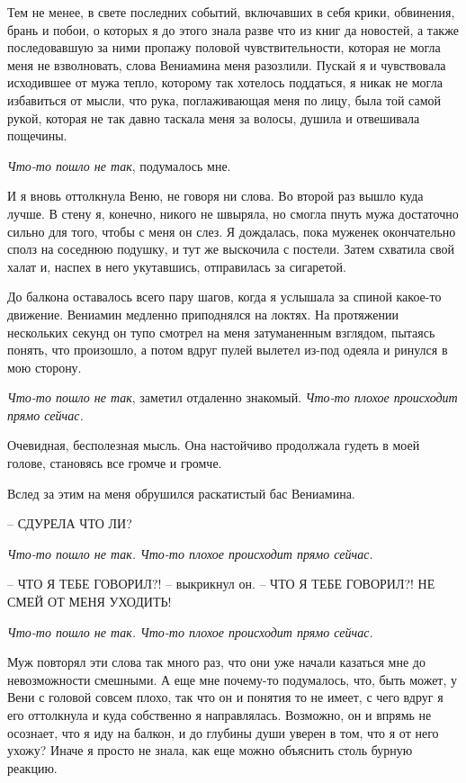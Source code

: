 \documentclass[
]{book}
\begin{document}
Тем не менее, в свете последних событий, включавших в себя крики, обвинения, брань и побои, о которых я до этого знала разве что из книг да новостей, а также последовавшую за ними пропажу половой чувствительности, которая не могла меня не взволновать, слова Вениамина меня разозлили. Пускай я и чувствовала исходившее от мужа тепло, которому так хотелось поддаться, я никак не могла избавиться от мысли, что рука, поглаживающая меня по лицу, была той самой рукой, которая не так давно таскала меня за волосы, душила и отвешивала пощечины.

\emph{Что-то пошло не так}, подумалось мне.

И я вновь оттолкнула Веню, не говоря ни слова. Во второй раз вышло куда лучше. В стену я, конечно, никого не швыряла, но смогла пнуть мужа достаточно сильно для того, чтобы с меня он слез. Я дождалась, пока муженек окончательно сполз на соседнюю подушку, и тут же выскочила с постели. Затем схватила свой халат и, наспех в него укутавшись, отправилась за сигаретой.

До балкона оставалось всего пару шагов, когда я услышала за спиной какое-то движение. Вениамин медленно приподнялся на локтях. На протяжении нескольких секунд он тупо смотрел на меня затуманенным взглядом, пытаясь понять, что произошло, а потом вдруг пулей вылетел из-под одеяла и ринулся в мою сторону.

\emph{Что-то пошло не так}, заметил отдаленно знакомый. \emph{Что-то плохое происходит прямо сейчас.}

Очевидная, бесполезная мысль. Она настойчиво продолжала гудеть в моей голове, становясь все громче и громче.

Вслед за этим на меня обрушился раскатистый бас Вениамина.

-- СДУРЕЛА ЧТО ЛИ?

\emph{Что-то пошло не так. Что-то плохое происходит прямо сейчас.}

-- ЧТО Я ТЕБЕ ГОВОРИЛ?! -- выкрикнул он. -- ЧТО Я ТЕБЕ ГОВОРИЛ?! НЕ СМЕЙ ОТ МЕНЯ УХОДИТЬ!

\emph{Что-то пошло не так. Что-то плохое происходит прямо сейчас.}

Муж повторял эти слова так много раз, что они уже начали казаться мне до невозможности смешными. А еще мне почему-то подумалось, что, быть может, у Вени с головой совсем плохо, так что он и понятия то не имеет, с чего вдруг я его оттолкнула и куда собственно я направлялась. Возможно, он и впрямь не осознает, что я иду на балкон, и до глубины души уверен в том, что я от него ухожу? Иначе я просто не знала, как еще можно объяснить столь бурную реакцию.
\end{document}

